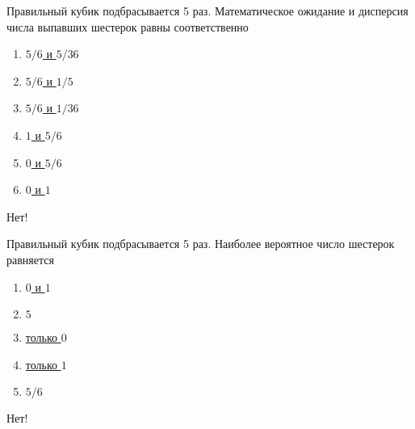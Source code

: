 \documentclass[t]{beamer}
\begin{document}
 \begin{frame} \label{23-No} 
\begin{block}{23} 

Правильный кубик подбрасывается 5 раз. Математическое ожидание и дисперсия числа выпавших шестерок равны соответственно
  


 \end{block} 
\begin{enumerate} 
\item[] \hyperlink{23-No}{\beamergotobutton{} $5/6$ и $5/36$}
\item[] \hyperlink{23-No}{\beamergotobutton{} $5/6$ и $1/5$}
\item[] \hyperlink{23-No}{\beamergotobutton{} $5/6$ и $1/36$}
\item[] \hyperlink{23-No}{\beamergotobutton{} $1$ и $5/6$}
\item[] \hyperlink{23-No}{\beamergotobutton{} $0$ и $5/6$}
\item[] \hyperlink{23-No}{\beamergotobutton{} $0$ и $1$}
\end{enumerate} 

 \alert{Нет!}
 \hyperlink{24}{}
\end{frame} 


 \begin{frame} \label{24-No} 
\begin{block}{24} 

  Правильный кубик подбрасывается 5 раз. Наиболее вероятное число шестерок равняется
  


 \end{block} 
\begin{enumerate} 
\item[] \hyperlink{24-Yes}{\beamergotobutton{} $0$ и $1$}
\item[] \hyperlink{24-No}{\beamergotobutton{} $5$}
\item[] \hyperlink{24-No}{\beamergotobutton{} только $0$}
\item[] \hyperlink{24-No}{\beamergotobutton{} только $1$}
\item[] \hyperlink{24-No}{\beamergotobutton{} $5/6$}
\end{enumerate} 

 \alert{Нет!} 
\end{frame} 
\end{document}
